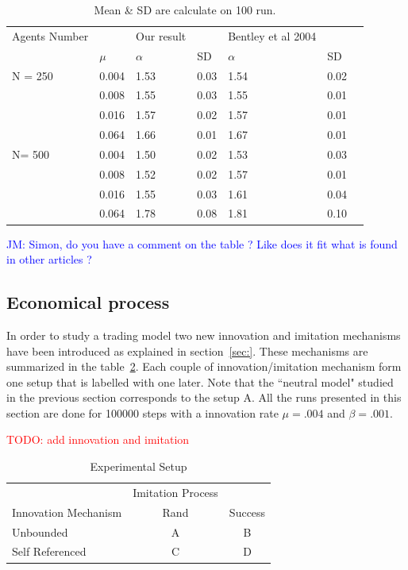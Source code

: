 \documentclass{wscpaperproc}
\newcommand{\memo}[2]{\textcolor{#1}{#2}}
\newcommand{\todo}[1]{\memo{red}{TODO: #1\\}}
\newcommand{\jm}[1]{\memo{blue}{JM: #1\\}}
\begin{document}
\begin{table}[h]
	\centering
	\begin{tabular}{ll|lllll}
		Agents Number & & Our result& & Bentley et al 2004\\
			&$\mu$ & $\alpha$ & SD&$\alpha$&SD\\\hline

		N = 250 
			&0.004&1.53&0.03&1.54&0.02\\
			&0.008&1.55&0.03&1.55&0.01\\
			&0.016&1.57&0.02&1.57&0.01\\
			&0.064&1.66&0.01&1.67&0.01\\\hline
		N= 500
		&0.004&1.50&0.02&1.53&0.03\\
		&0.008&1.52&0.02&1.57&0.01\\
		&0.016&1.55&0.03&1.61&0.04\\
		&0.064&1.78&0.08&1.81&0.10\\
	\end{tabular}
	\caption{Mean \& SD are calculate on 100 run.}
	\label{tab:mualpha}
\end{table}

\jm{Simon, do you have a comment on the table ? Like does it fit what is found in other articles ?}


\subsection{ Economical  process}

In order to study a trading model two new innovation and imitation mechanisms have been introduced as explained in section~\ref{sec:}. These mechanisms are summarized in the table~\ref{tab:exp}. Each couple of innovation/imitation mechanism form one setup that is labelled with one later. Note that the ``neutral model" studied in the previous section corresponds to the setup A. All the runs presented in this section are done for 100000 steps with a innovation rate $\mu=.004$ and $\beta=.001$.

\todo{add innovation and imitation}
\begin{table}[h]
	\centering
	\begin{tabular}{l|cc}
					&Imitation  Process \\
		Innovation Mechanism	& Rand & Success \\\hline  
		Unbounded 		&A & B \\
		Self Referenced	& C & D \\
	\end{tabular}
	\caption{Experimental Setup}
	\label{tab:exp}
\end{table}
\end{document}
